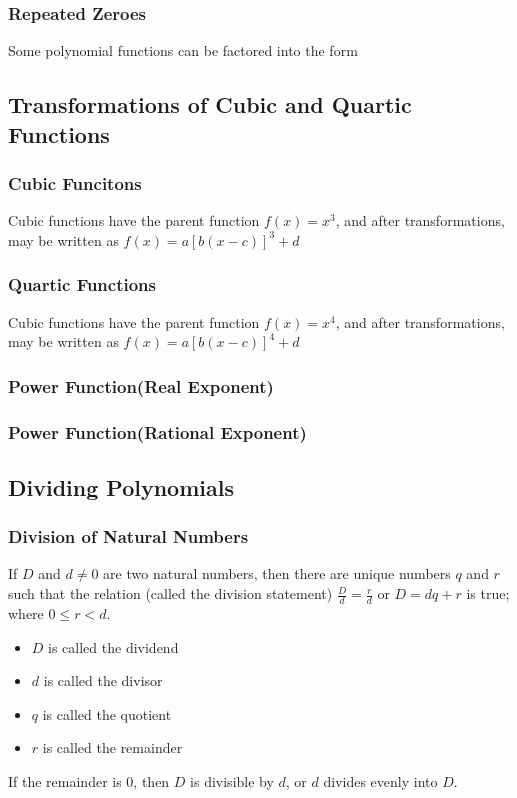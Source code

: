 \documentclass{article}
\begin{document}
	\subsubsection{Repeated Zeroes}
	Some polynomial functions can be factored into the form 
	\subsection{Transformations of Cubic and Quartic Functions}
	\subsubsection{Cubic Funcitons}
	Cubic functions have the parent function $f(x)=x^3$, and after transformations, may be written as $f(x)=a[b(x-c)]^3+d$
	\subsubsection{Quartic Functions}
	Cubic functions have the parent function $f(x)=x^4$, and after transformations, may be written as $f(x)=a[b(x-c)]^4+d$
	\subsubsection{Power Function(Real Exponent)}
	\subsubsection{Power Function(Rational Exponent)}
	\subsection{Dividing Polynomials}
	\subsubsection{Division of Natural Numbers}
	If $D$ and $d\neq0$ are two natural numbers, then there are unique numbers $q$ and $r$ such that the relation (called the division statement) $\frac{D}{d}=\frac{r}{d}$ or $D=dq+r$ is true; where $0\leq r<d$.
	\begin{itemize}
		\item $D$ is called the dividend
		\item $d$ is called the divisor
		\item $q$ is called the quotient
		\item $r$ is called the remainder
	\end{itemize}
	If the remainder is 0, then $D$ is divisible by $d$, or $d$ divides evenly into $D$.
\end{document}
